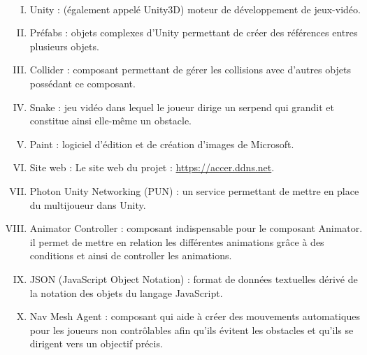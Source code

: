 \documentclass[titlepage, 13px, a4paper]{report}
\begin{document}
\paragraph*{} \hspace{0pt}
{\begin{enumerate}[I.]
	\item Unity : (également appelé Unity3D) moteur de développement de jeux-vidéo. \\
	
	\item Préfabs : objets complexes d'Unity permettant de créer des références 
	entres plusieurs objets. \\
	
	\item Collider : composant permettant de gérer les collisions avec d'autres objets 
	possédant ce composant.    \\

	\item Snake : jeu vidéo dans lequel le joueur dirige un serpend qui grandit et constitue 
	ainsi elle-même un obstacle.        \\

	\item Paint : logiciel d'édition et de création d'images de Microsoft.    \\

	\item Site web : Le site web du projet : \url{https://accer.ddns.net}.    \\

	\item Photon Unity Networking (PUN) : un service permettant de mettre en 
	place du multijoueur dans Unity. \\

	\item Animator Controller : composant indispensable pour le composant Animator.
		il permet de mettre en relation les différentes animations grâce à des conditions
		et ainsi de controller les animations.   \\

	\item JSON (JavaScript Object Notation) : format de données textuelles dérivé de la 
	notation des objets du langage JavaScript.    \\

	\item Nav Mesh Agent : composant qui aide à créer des mouvements automatiques pour les 
	joueurs non contrôlables afin qu'ils évitent les obstacles et qu'ils se dirigent vers 
	un objectif précis.           \\


\end{enumerate}}
\end{document}
